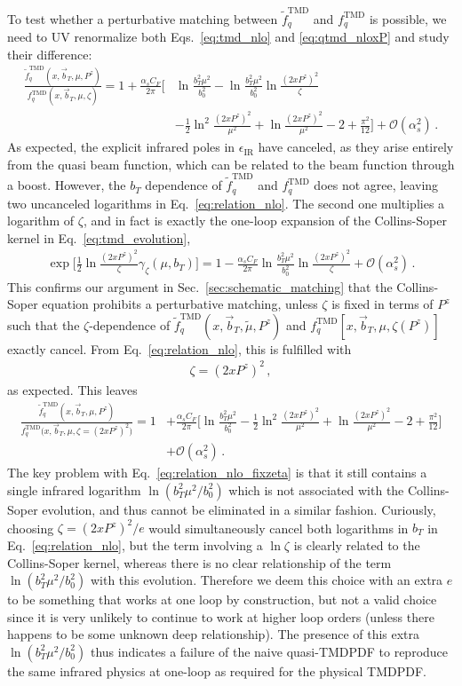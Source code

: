 \documentclass[11pt,a4paper]{article}
\DeclareRobustCommand{\eq}[1]{Eq.~\eqref{eq:#1}}
\DeclareRobustCommand{\eqs}[2]{Eqs.~\eqref{eq:#1} and \eqref{eq:#2}}
\DeclareRobustCommand{\sec}[1]{Sec.~\ref{sec:#1}}
\newcommand{\eps}{\epsilon}
\newcommand{\cO}{\mathcal{O}}
\newcommand{\nn}{\nonumber}
\newcommand{\as}{\alpha_s}
\newcommand{\IR}{\mathrm{IR}}
\newcommand\TMD{\mathrm{TMD}}
\newcommand{\Lb}[1]{\ln^{#1}\frac{b_T^2 \mu^2}{b_0^2}}
\newcommand{\bt}{\vec b_T}
\begin{document}
To test whether a perturbative matching between $\tilde f_q^\TMD$ and $f_q^\TMD$ is possible,
we need to UV renormalize both \eqs{tmd_nlo}{qtmd_nloxP} and study their difference:
\begin{align} \label{eq:relation_nlo}
 \frac{\tilde f_{q}^{\TMD}(x, \bt, \mu, P^z)}{f_{q}^{\TMD}(x, \bt, \mu, \zeta)}
 = 1 + \frac{\as C_F}{2\pi} \biggl[& \Lb{} - \Lb{} \ln\frac{(2xP^z)^2}{\zeta}
   \\\nn&
   - \frac{1}{2} \ln^2\frac{(2xP^z)^2}{\mu^2}  + \ln\frac{(2xP^z)^2}{\mu^2}
   - 2 + \frac{\pi^2}{12}
   \biggr] + \cO(\as^2)
\,.\end{align}
As expected, the explicit infrared poles in $\eps_\IR$ have canceled, as they arise entirely from the quasi beam function, which can be related to the beam function through a boost.
However, the $b_T$ dependence of $\tilde f_q^\TMD$ and $f_q^\TMD$ does not agree, leaving two uncanceled logarithms in \eq{relation_nlo}.
The second one multiplies a logarithm of $\zeta$, and in fact is exactly the one-loop expansion of the Collins-Soper kernel in \eq{tmd_evolution},
\begin{align}
 \exp\biggl[ \frac12 \ln\frac{(2xP^z)^2}{\zeta} \gamma_\zeta(\mu,b_T) \biggr]
 = 1 -  \frac{\as C_F}{2\pi} \Lb{} \ln\frac{(2xP^z)^2}{\zeta} + \cO(\as^2)
\,.\end{align}
This confirms our argument in \sec{schematic_matching} that the Collins-Soper equation prohibits a perturbative matching, unless $\zeta$ is fixed in terms of $P^z$ such that the $\zeta$-dependence of $\tilde f_q^\TMD(x, \bt, \tilde\mu, P^z)$ and $f_q^\TMD[x, \bt, \mu, \zeta(P^z)]$ exactly cancel.
From \eq{relation_nlo}, this is fulfilled with
\begin{align}
 \zeta = (2 x P^z)^2
\,,\end{align}
as expected. This leaves
\begin{align} \label{eq:relation_nlo_fixzeta}
 \frac{\tilde f_{q}^{\TMD}(x, \bt, \mu, P^z)}{f_{q}^{\TMD}\big(x, \bt, \mu, \zeta\!=\!(2xP^z)^2\big)}
 = 1 &+ \frac{\as C_F}{2\pi} \biggl[ \Lb{} 
   - \frac{1}{2} \ln^2\frac{(2xP^z)^2}{\mu^2}  + \ln\frac{(2xP^z)^2}{\mu^2}
   - 2 + \frac{\pi^2}{12}
   \biggr] 
  \nn \\
   &+ \cO(\as^2)
   \,.
\end{align}
The key problem with \eq{relation_nlo_fixzeta} is that it still contains a single infrared logarithm $\ln(b_T^2 \mu^2/b_0^2)$ which is not associated with the Collins-Soper evolution, and thus cannot be eliminated in a similar fashion.
Curiously, choosing $\zeta = (2xP^z)^2 / e$ would simultaneously cancel both logarithms in $b_T$ in \eq{relation_nlo}, but the term involving a $\ln\zeta$ is clearly related to the Collins-Soper kernel, whereas there is no clear relationship of the term $\ln(b_T^2 \mu^2/b_0^2)$ with this evolution. 
Therefore we deem this choice with an extra $e$ to be something that works at one loop by construction, but not a valid choice since it is very unlikely to continue to work at higher loop orders (unless there happens to be some unknown deep relationship).
The presence of this extra $\ln(b_T^2 \mu^2/b_0^2)$ thus indicates a failure of the naive quasi-TMDPDF to reproduce the same infrared physics at one-loop as required for the physical TMDPDF.
\end{document}
